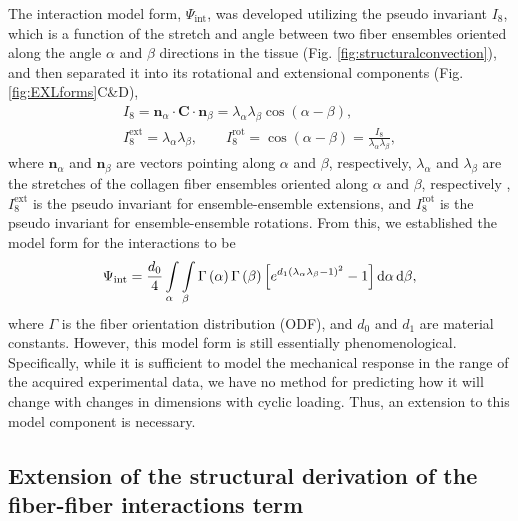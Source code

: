     The interaction model form, $\Psi_\mathrm{int}$, was developed utilizing the pseudo invariant $I_8$, which is a function of the stretch and angle between two fiber ensembles oriented along the angle $\alpha$ and $\beta$ directions in the tissue (Fig. \ref{fig:structuralconvection}), and then separated it into its rotational and extensional components\cite{sacks_novel_2016} (Fig. \ref{fig:EXLforms}C\&D),
\begin{equation} \label{eq:I8invariant}
\begin{gathered}
I_8 = \mathbf{n}_ \alpha \cdot\mathbf{C}\cdot\mathbf{n}_\beta = \lambda_\alpha \lambda_\beta \cos(\alpha - \beta), \\
I_8^{\mathrm{ext}} = \lambda_\alpha \lambda_\beta, \qquad I_8^{\mathrm{rot}} = \cos(\alpha - \beta) = \frac{I_8}{\lambda_\alpha \lambda_\beta},
\end{gathered}
\end{equation}
    where $\mathbf{n}_\alpha$ and $\mathbf{n}_\beta$ are vectors pointing along $\alpha$ and $\beta$, respectively, $\lambda_\alpha$ and $\lambda_\beta$ are the stretches of the collagen fiber ensembles oriented along $\alpha$ and $\beta$, respectively , $I_8^\mathrm{ext}$ is the pseudo invariant for ensemble-ensemble extensions, and $I_8^\mathrm{rot}$ is the pseudo invariant for ensemble-ensemble rotations. From this, we established the model form for the interactions to be
\begin{equation}
\Psi_{\mathrm{int}} = \frac{d_0}{4}\int\displaylimits_\alpha \int\displaylimits_\beta \Gamma\left(\alpha\right)\Gamma \left( \beta \right)\left[ e^{d_1(\lambda_\alpha \lambda_\beta - 1)^2}-1 \right] \mathrm{d}\alpha\, \mathrm{d}\beta,
\end{equation}
    where $\Gamma$ is the fiber orientation distribution (ODF), and $d_0$ and $d_1$ are material constants. 
	However, this model form is still essentially phenomenological. 
	Specifically, while it is sufficient to model the mechanical response in the range of the acquired experimental data, we have no method for predicting how it will change with changes in dimensions with cyclic loading. Thus, an extension to this model component is necessary.


\subsection{Extension of the structural derivation of the fiber-fiber interactions term}

